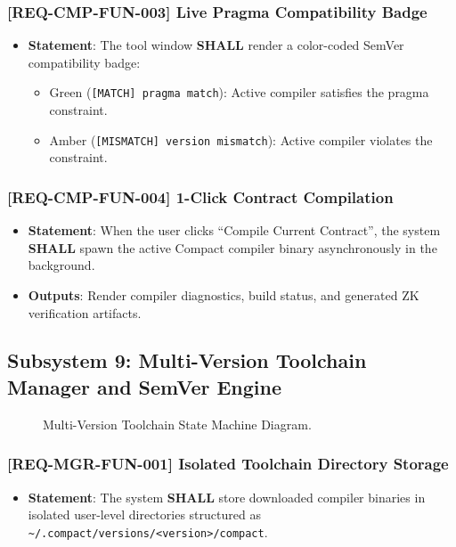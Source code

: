 \subsubsection{[REQ-CMP-FUN-003] Live Pragma Compatibility Badge}
\begin{itemize}
    \item \textbf{Statement}: The tool window \textbf{SHALL} render a color-coded SemVer compatibility badge:
    \begin{itemize}
        \item Green (\texttt{[MATCH] pragma match}): Active compiler satisfies the pragma constraint.
        \item Amber (\texttt{[MISMATCH] version mismatch}): Active compiler violates the constraint.
    \end{itemize}
\end{itemize}

\subsubsection{[REQ-CMP-FUN-004] 1-Click Contract Compilation}
\begin{itemize}
    \item \textbf{Statement}: When the user clicks ``Compile Current Contract'', the system \textbf{SHALL} spawn the active Compact compiler binary asynchronously in the background.
    \item \textbf{Outputs}: Render compiler diagnostics, build status, and generated ZK verification artifacts.
\end{itemize}

\subsection{Subsystem 9: Multi-Version Toolchain Manager and SemVer Engine}
\label{sec:subsystem_toolchain}

\begin{figure}[htbp]
    \centering
    
    \caption{Multi-Version Toolchain State Machine Diagram.}
    \label{fig:state_toolchain}
\end{figure}

\subsubsection{[REQ-MGR-FUN-001] Isolated Toolchain Directory Storage}
\begin{itemize}
    \item \textbf{Statement}: The system \textbf{SHALL} store downloaded compiler binaries in isolated user-level directories structured as \texttt{\textasciitilde/.compact/versions/<version>/compact}.
\end{itemize}


